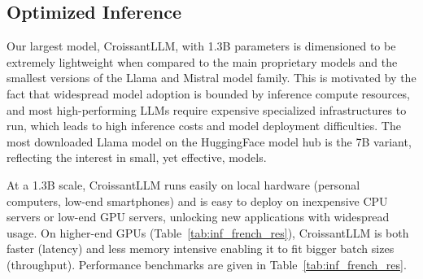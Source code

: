 \subsection{Optimized Inference}
Our largest model, CroissantLLM, with 1.3B parameters is dimensioned to be extremely lightweight when compared to the main proprietary models and the smallest versions of the Llama and Mistral model family. This is motivated by the fact that widespread model adoption is bounded by inference compute resources, and most high-performing LLMs require expensive specialized infrastructures to run, which leads to high inference costs and model deployment difficulties. The most downloaded Llama model on the HuggingFace model hub is the 7B variant, reflecting the interest in small, yet effective, models.

At a 1.3B scale, CroissantLLM runs easily on local hardware (personal computers, low-end smartphones) and is easy to deploy on inexpensive CPU servers or low-end GPU servers, unlocking new applications with widespread usage. On higher-end GPUs (Table~\ref{tab:inf_french_res}), CroissantLLM is both faster (latency) and less memory intensive enabling it to fit bigger batch sizes (throughput). Performance benchmarks are given in Table~\ref{tab:inf_french_res}.  

\begin{table}
    \centering
    \caption[Inference throughput results]{Inference Results in French and English on an A100 GPU with 40GB VRAM (average results over 100 tokens generations with 100 tokens input based on 100 Wikipedia text samples, vLLM backend and batch size 1)}
    \label{tab:inf_french_res}
\end{table}

